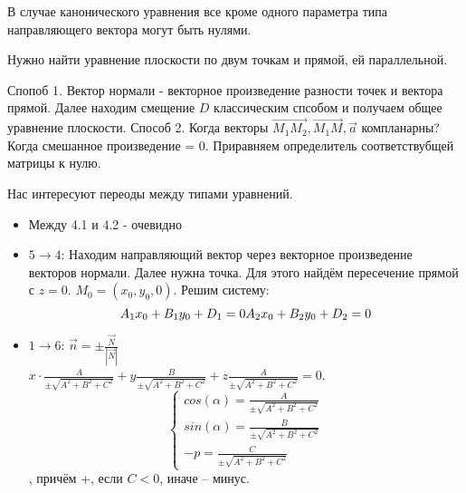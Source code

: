 \documentclass[12pt, a4paper]{article}
\begin{document}
    \begin{note}
        В случае канонического уравнения все кроме одного параметра типа направляющего вектора могут быть нулями.
    \end{note}


    \begin{example}
        Нужно найти уравнение плоскости по двум точкам и прямой, ей параллельной.

        Спопоб 1. Вектор нормали - векторное произведение разности точек и вектора прямой. Далее находим смещение $D$ классическим спсобом и получаем общее уравнение плоскости.
        Способ 2. Когда векторы $\vec{M_1M_2}, \vec{M_1M}, \vec{a}$ компланарны? Когда смешанное произведение = 0. Приравняем определитель соответствубщей матрицы к нулю.
    \end{example}


    Нас интересуют переоды между типами уравнений.

    \begin{itemize}
        \item Между 4.1 и 4.2 - очевидно
        \item $5 \to 4$: Находим направляющий вектор через векторное произведение векторов нормали.
                        Далее нужна точка. Для этого найдём пересечение прямой с $z = 0$.
                        $M_0 = (x_0, y_0, 0)$. Решим систему: \begin{equation}
                            A_1 x_0 + B_1 y_0 + D_1 = 0 \\
                            A_2 x_0 + B_2 y_0 + D_2 = 0
                        \end{equation} 
        \item $1 \to 6$: $\vec{n} = \pm \frac{\vec{N}}{|\vec{N}|}$ \\
        $x \cdot \frac{A}{\pm\sqrt{A^2 + B^2 + C^2}} + y\frac{B}{\pm\sqrt{A^2 + B^2 + C^2}} + z \frac{A}{\pm\sqrt{A^2 + B^2 + C^2}} = 0$.
        \begin{equation}
            \begin{cases}
                cos(\alpha) = \frac{A}{\pm\sqrt{A^2 + B^2 + C^2}} \\
                sin(\alpha) = \frac{B}{\pm\sqrt{A^2 + B^2 + C^2}} \\
                -p = \frac{C}{\pm\sqrt{A^2 + B^2 + C^2}}
            \end{cases}
        \end{equation}, причём +, если $C < 0$, иначе -- минус.
    \end{itemize}
\end{document}
